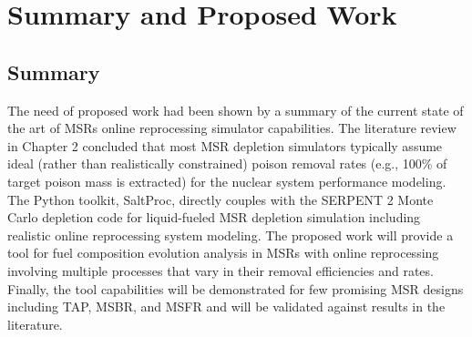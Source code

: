 \chapter[Summary and Proposed Work]{Summary and Proposed Work}

\section{Summary}
The need of proposed work had been shown by a summary of the 
current state of the art of \glspl{MSR} online reprocessing 
simulator capabilities. The literature review in Chapter 2 
concluded that most \gls{MSR} depletion simulators typically 
assume ideal (rather than realistically constrained) poison 
removal rates (e.g., 100\% of target poison mass is extracted) 
for the nuclear system performance modeling. The Python 
toolkit, SaltProc, directly couples with the SERPENT 2 Monte 
Carlo depletion 
code for liquid-fueled \gls{MSR} depletion simulation 
including realistic online reprocessing system modeling. 
The proposed work will provide a  
tool for fuel composition evolution analysis in \glspl{MSR} with 
online reprocessing involving multiple processes 
that vary in their removal efficiencies and rates. Finally, 
the tool capabilities will be demonstrated for few promising 
\gls{MSR} designs including \gls{TAP}, 
\gls{MSBR}, and \gls{MSFR} and will be validated against results 
in the literature.

 
